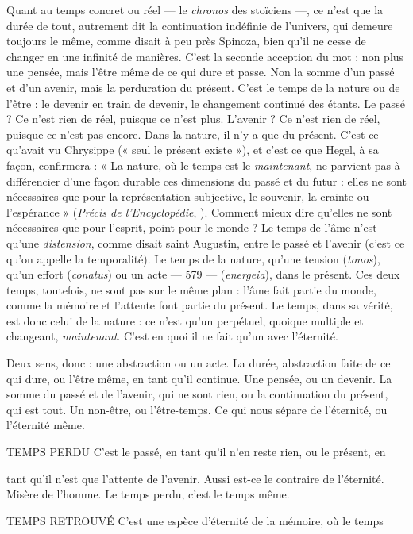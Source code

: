 Quant au temps concret ou réel — le {\it chronos} des stoïciens —, ce n’est que la
durée de tout, autrement dit la continuation indéfinie de l’univers, qui
demeure toujours le même, comme disait à peu près Spinoza, bien qu’il ne
cesse de changer en une infinité de manières. C’est la seconde acception du
mot : non plus une pensée, mais l'être même de ce qui dure et passe. Non la
somme d’un passé et d’un avenir, mais la perduration du présent. C’est le
temps de la nature ou de l’être : le devenir en train de devenir, le changement
continué des étants. Le passé ? Ce n’est rien de réel, puisque ce n’est plus.
L'avenir ? Ce n’est rien de réel, puisque ce n’est pas encore. Dans la nature, il
n’y a que du présent. C’est ce qu'avait vu Chrysippe (« seul le présent existe »),
et c’est ce que Hegel, à sa façon, confirmera : « La nature, où le temps est le
{\it maintenant}, ne parvient pas à différencier d’une façon durable ces dimensions
du passé et du futur : elles ne sont nécessaires que pour la représentation subjective,
le souvenir, la crainte ou l’espérance » ({\it Précis de l'Encyclopédie}, ).
Comment mieux dire qu’elles ne sont nécessaires que pour l’esprit, point pour
le monde ? Le temps de l’âme n’est qu’une {\it distension}, comme disait saint
Augustin, entre le passé et l’avenir (c’est ce qu’on appelle la temporalité). Le
temps de la nature, qu’une tension ({\it tonos}), qu’un effort ({\it conatus}) ou un acte
— 579 —
({\it energeia}), dans le présent. Ces deux temps, toutefois, ne sont pas sur le même
plan : l’âme fait partie du monde, comme la mémoire et l'attente font partie du
présent. Le temps, dans sa vérité, est donc celui de la nature : ce n’est qu’un
perpétuel, quoique multiple et changeant, {\it maintenant}. C’est en quoi il ne fait
qu’un avec l'éternité.

Deux sens, donc : une abstraction ou un acte. La durée, abstraction faite de
ce qui dure, ou l’être même, en tant qu’il continue. Une pensée, ou un devenir.
La somme du passé et de l'avenir, qui ne sont rien, ou la continuation du présent,
qui est tout. Un non-être, ou l’être-temps. Ce qui nous sépare de l’éternité,
ou l'éternité même.

TEMPS PERDU C'est le passé, en tant qu’il n’en reste rien, ou le présent, en

tant qu’il n’est que l'attente de l’avenir. Aussi est-ce le
contraire de l'éternité. Misère de l’homme. Le temps perdu, c’est le temps
même.

TEMPS RETROUVÉ C’est une espèce d’éternité de la mémoire, où le temps

